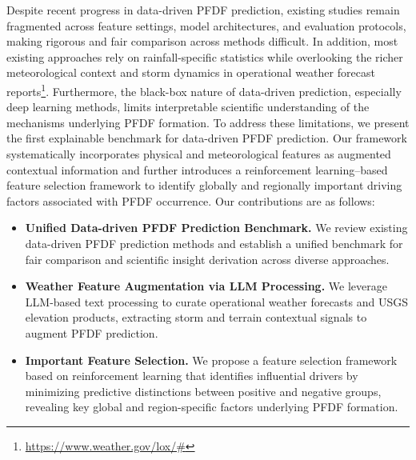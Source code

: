 
Despite recent progress in data-driven PFDF prediction, existing studies remain fragmented across feature settings, model architectures, and evaluation protocols, making rigorous and fair comparison across methods difficult. In addition, most existing approaches rely on rainfall-specific statistics while overlooking the richer meteorological context and storm dynamics in operational weather forecast reports\footnote{\protect\url{https://www.weather.gov/lox/\#}}. Furthermore, the black-box nature of data-driven prediction, especially deep learning methods, limits interpretable scientific understanding of the mechanisms underlying PFDF formation.
%
To address these limitations, we present the first explainable benchmark for data-driven PFDF prediction. Our framework systematically incorporates physical and meteorological features as augmented contextual information and further introduces a reinforcement learning–based feature selection framework to identify globally and regionally important driving factors associated with PFDF occurrence. Our contributions are as follows:
%
\begin{itemize}[leftmargin=*, itemsep=0pt]
\item \textbf{Unified Data-driven PFDF Prediction Benchmark.} We review existing data-driven PFDF prediction methods and establish a unified benchmark for fair comparison and scientific insight derivation across diverse approaches.

\item \textbf{Weather Feature Augmentation via LLM Processing.} We leverage LLM-based text processing to curate operational weather forecasts and USGS elevation products, extracting storm and terrain contextual signals to augment PFDF prediction.

\item \textbf{Important Feature Selection.} We propose a feature selection framework based on reinforcement learning that identifies influential drivers by minimizing predictive distinctions between positive and negative groups, revealing key global and region-specific factors underlying PFDF formation.
\end{itemize}
